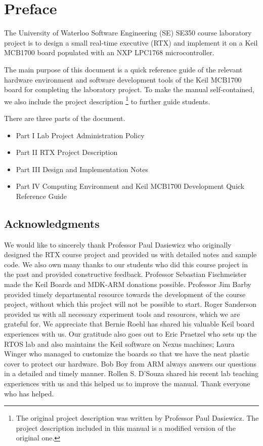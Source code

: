 \frontmatter 


\chapter{Preface}

The University of Waterloo Software Engineering (SE) SE350 course laboratory project is 
to design a small real-time executive (RTX) and implement it 
on a Keil MCB1700 board populated with an NXP LPC1768 microcontroller.

The main purpose of this document is a quick reference guide of the relevant hardware environment 
and software development tools of the Keil MCB1700 board for completing the laboratory project.
To make the manual self-contained, we also include the project description
\footnote{The original project description was written by Professor Paul Dasiewicz. 
The project description included in this manual is a modified version of the original one.}
to further guide students.

There are three parts of the document.
\begin{itemize}
\item {Part I  Lab Project Administration Policy}
\item {Part II  RTX Project Description}
\item {Part III  Design and Implementation Notes}
\item {Part IV  Computing Environment and Keil MCB1700 Development Quick Reference Guide}

\end{itemize}


\section*{Acknowledgments}
We would like to sincerely thank Professor Paul Dasiewicz who originally designed the RTX course project and provided us with detailed notes and sample code. We also own many thanks to our students who did this course project in the past and provided constructive feedback. Professor Sebastian Fischmeister made the Keil Boards and MDK-ARM donations possible. Professor Jim Barby provided timely departmental resource towards the development of the course project, without which this project will not be possible to start. Roger Sanderson provided us with all necessary experiment tools and resources, which we are grateful for.  We appreciate that Bernie Roehl has shared his valuable Keil board experiences with us. Our gratitude also goes out to Eric Praetzel who sets up the RTOS lab and also maintains the Keil software on Nexus machines; Laura Winger who managed to customize the boards so that we have the neat plastic cover to protect our hardware. Bob Boy from ARM always answers our questions in a detailed and timely manner. Rollen S. D'Souza shared his recent lab teaching experiences with us and this helped us to improve the manual. Thank everyone who has helped.

